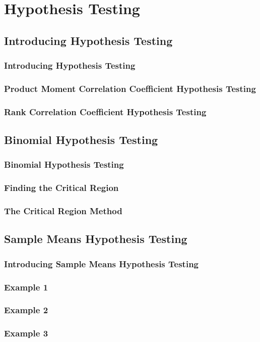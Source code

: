 \documentclass[../maths.tex]{subfiles}
\begin{document}
\chapter{Hypothesis Testing}
\section{Introducing Hypothesis Testing}
\subsection*{Introducing Hypothesis Testing}
\subsection*{Product Moment Correlation Coefficient Hypothesis Testing}
\subsection*{Rank Correlation Coefficient Hypothesis Testing}
\section{Binomial Hypothesis Testing}
\subsection*{Binomial Hypothesis Testing}
\subsection*{Finding the Critical Region}
\subsection*{The Critical Region Method}
\section{Sample Means Hypothesis Testing}
\subsection*{Introducing Sample Means Hypothesis Testing}
\subsection*{Example 1}
\subsection*{Example 2}
\subsection*{Example 3}
\end{document}
